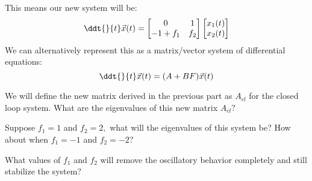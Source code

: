\begin{enumerate}[resume]
{  This means our new system will be:
  \begin{equation}
    \ddt{}{t} \vec{x}(t) =
    \begin{bmatrix}
    0 & 1 \\
    -1 + f_1 & f_2
    \end{bmatrix}
    \begin{bmatrix} x_1(t) \\ x_2(t) \end{bmatrix}
  \end{equation}
  We can alternatively represent this as a matrix/vector system of differential equations:
  \begin{equation}
    \ddt{}{t} \vec{x}(t) = (A + BF) \vec{x}(t)
  \end{equation}
}

\qitem We will define the new matrix derived in the previous part as $A_{cl}$ for the closed loop system.
What are the eigenvalues of this new matrix $A_{cl}?$

\ws{
\vspace{125px}
}



\qitem Suppose $f_1 = 1$ and $f_2 = 2,$ what will the eigenvalues of this system be?
How about when $f_1 = -1$ and $f_2 = -2$?

\ws{
\vspace{125px}
}



\qitem What values of $f_1$ and $f_2$ will remove the oscillatory behavior completely and still stabilize the system?


\end{enumerate}
